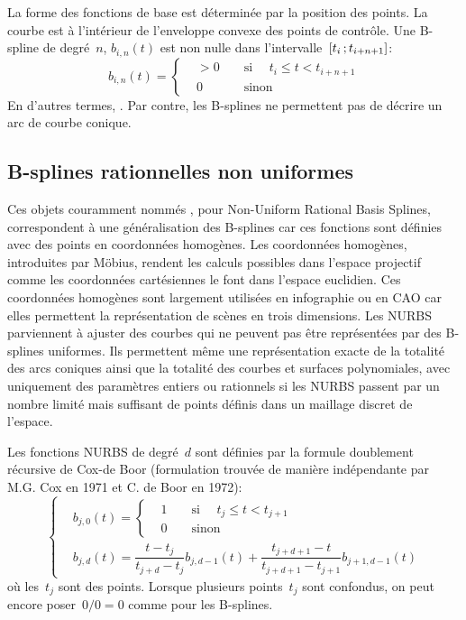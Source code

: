La forme des fonctions de base est déterminée par la position des points. La courbe est à l'intérieur de l'enveloppe convexe des points de contrôle. Une B-spline de degré~$n$, $b_{i,n}(t)$ est non nulle dans l'intervalle~$\mathopen{[}t_i\,;t_{i+n+1}\mathclose{]}$: 
\begin{equation}
b_{i,n}(t) =\left\{\begin{aligned}
&>0 && \text{ si } \quad t_{i} \leqslant t < t_{i+n+1} \\
&0 && \text{ sinon } 
\end{aligned}\right. 
\end{equation}
En d'autres termes, . Par contre, les B-splines ne permettent pas de décrire un arc de courbe conique. 

\medskip
\subsection{B-splines rationnelles non uniformes} 

Ces objets couramment nommés , pour Non-Uniform Rational Basis Splines, correspondent à une généralisation des B-splines car ces fonctions sont définies avec des points en coordonnées homogènes. Les coordonnées homogènes, introduites par Möbius, rendent les calculs possibles dans l'espace projectif comme les coordonnées cartésiennes le font dans l'espace euclidien. Ces coordonnées homogènes sont largement utilisées en infographie ou en CAO car elles permettent la représentation de scènes en trois dimensions. Les NURBS parviennent à ajuster des courbes qui ne peuvent pas être représentées par des B-splines uniformes. Ils permettent même une représentation exacte de la totalité des arcs coniques ainsi que la totalité des courbes et surfaces polynomiales, avec uniquement des paramètres entiers ou rationnels si les NURBS passent par un nombre limité mais suffisant de points définis dans un maillage discret de l'espace. 

Les fonctions NURBS de degré~$d$ sont définies par la formule doublement récursive de Cox-de Boor (formulation trouvée de manière indépendante par M.G. Cox en 1971 et C. de Boor en 1972): 
\begin{equation}
\left\{\begin{aligned}
&b_{j,0}(t)=
\left\{\begin{aligned}
& 1 && \text{ si }\quad t_j \leq t < t_{j+1} \\
& 0 && \text{ sinon } 
\end{aligned}\right.\\ 
&b_{j,d}(t)= \dfrac{t-t_j}{t_{j+d}-t_j} b_{j,d-1}(t)+\dfrac{t_{j+d+1}-t}{t_{j+d+1}-t_{j+1}}b_{j+1,d-1}(t)
\end{aligned}\right. 
\end{equation}
où les~$t_j$ sont des points. Lorsque plusieurs points~$t_j$ sont confondus, on peut encore poser~$0/0=0$ comme pour les B-splines. 